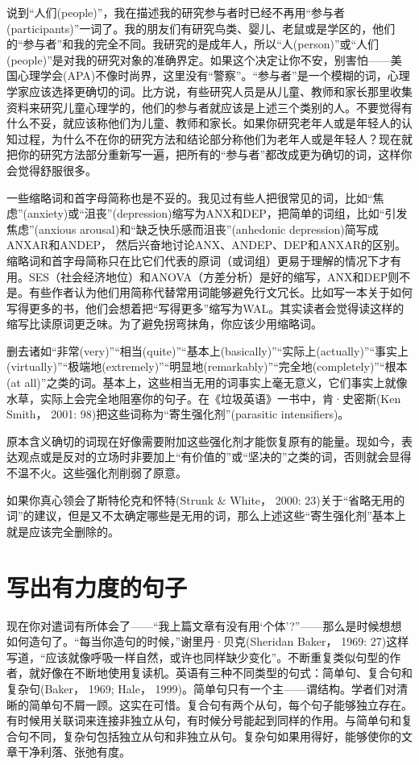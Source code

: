 说到“人们(people)”，我在描述我的研究参与者时已经不再用“参与者(participants)”一词了。我的朋友们有研究鸟类、婴儿、老鼠或是学区的，他们的“参与者”和我的完全不同。我研究的是成年人，所以“人(person)”或“人们(people)”是对我的研究对象的准确界定。如果这个决定让你不安，别害怕——美国心理学会(APA)不像时尚界，这里没有“警察”。“参与者”是一个模糊的词，心理学家应该选择更确切的词。比方说，有些研究人员是从儿童、教师和家长那里收集资料来研究儿童心理学的，他们的参与者就应该是上述三个类别的人。不要觉得有什么不妥，就应该称他们为儿童、教师和家长。如果你研究老年人或是年轻人的认知过程，为什么不在你的研究方法和结论部分称他们为老年人或是年轻人？现在就把你的研究方法部分重新写一遍，把所有的“参与者”都改成更为确切的词，这样你会觉得舒服很多。

一些缩略词和首字母简称也是不妥的。我见过有些人把很常见的词，比如“焦虑”(anxiety)或“沮丧”(depression)缩写为ANX和DEP，把简单的词组，比如“引发焦虑”(anxious arousal)和“缺乏快乐感而沮丧”(anhedonic depression)简写成ANXAR和ANDEP， 然后兴奋地讨论ANX、ANDEP、DEP和ANXAR的区别。缩略词和首字母简称只在比它们代表的原词（或词组）更易于理解的情况下才有用。SES（社会经济地位）和ANOVA（方差分析）是好的缩写，ANX和DEP则不是。有些作者认为他们用简称代替常用词能够避免行文冗长。比如写一本关于如何写得更多的书，他们会想着把“写得更多”缩写为WAL。其实读者会觉得读这样的缩写比读原词更乏味。为了避免拐弯抹角，你应该少用缩略词。

删去诸如“非常(very)”“相当(quite)”“基本上(basically)”“实际上(actually)”“事实上(virtually)”“极端地(extremely)”“明显地(remarkably)”“完全地(completely)”“根本(at all)”之类的词。基本上，这些相当无用的词事实上毫无意义，它们事实上就像水草，实际上会完全地阻塞你的句子。在《垃圾英语》一书中，肯·史密斯(Ken Smith， 2001: 98)把这些词称为“寄生强化剂”(parasitic intensifiers)。

{\kaishu 原本含义确切的词现在好像需要附加这些强化剂才能恢复原有的能量。现如今，表达观点或是反对的立场时非要加上“有价值的”或“坚决的”之类的词，否则就会显得不温不火。这些强化剂削弱了原意。}

如果你真心领会了斯特伦克和怀特(Strunk \& White， 2000: 23)关于“省略无用的词”的建议，但是又不太确定哪些是无用的词，那么上述这些“寄生强化剂”基本上就是应该完全删除的。


\section{写出有力度的句子}
现在你对遣词有所体会了——“我上篇文章有没有用‘个体’?”——那么是时候想想如何造句了。“每当你造句的时候，”谢里丹·贝克(Sheridan Baker， 1969: 27)这样写道，“应该就像呼吸一样自然，或许也同样缺少变化”。不断重复类似句型的作者，就好像在不断地使用复读机。英语有三种不同类型的句式：简单句、复合句和复杂句(Baker， 1969; Hale， 1999)。简单句只有一个主——谓结构。学者们对清晰的简单句不屑一顾。这实在可惜。复合句有两个从句，每个句子能够独立存在。有时候用关联词来连接非独立从句，有时候分号能起到同样的作用。与简单句和复合句不同，复杂句包括独立从句和非独立从句。复杂句如果用得好，能够使你的文章干净利落、张弛有度。

